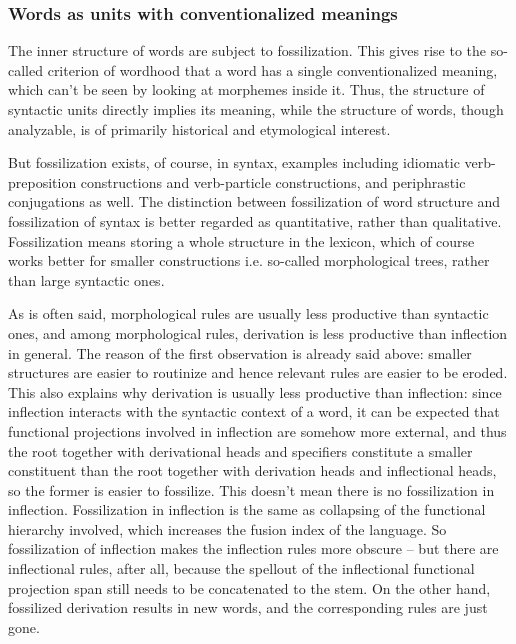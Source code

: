 \documentclass[UTF8, a4paper, oneside, scheme=plain]{ctexart}
\begin{document}
\subsubsection{Words as units with conventionalized meanings}\label{sec:word-meaning}

The inner structure of words are subject to fossilization.
This gives rise to the so-called criterion of wordhood 
that a word has a single conventionalized meaning,
which can't be seen by looking at morphemes inside it.
Thus, the structure of syntactic units directly implies its meaning,
while the structure of words,
though analyzable,
is of primarily historical and etymological interest.

But fossilization exists, of course, in syntax,
examples including idiomatic verb-preposition constructions 
and verb-particle constructions,
and periphrastic conjugations as well.
The distinction between fossilization of word structure and fossilization of syntax 
is better regarded as quantitative, rather than qualitative.
Fossilization means storing a whole structure in the lexicon,
which of course works better for smaller constructions i.e. so-called morphological trees,
rather than large syntactic ones.

As is often said, morphological rules are usually less productive than syntactic ones,
and among morphological rules,
derivation is less productive than inflection in general.
The reason of the first observation is already said above:
smaller structures are easier to routinize 
and hence relevant rules are easier to be eroded.
This also explains why derivation is usually less productive than inflection:
since inflection interacts with the syntactic context of a word,
it can be expected that functional projections involved in inflection 
are somehow more external,
and thus the root together with derivational heads and specifiers
constitute a smaller constituent than 
the root together with derivation heads and inflectional heads,
so the former is easier to fossilize.
This doesn't mean there is no fossilization in inflection.
Fossilization in inflection is the same as collapsing of the functional hierarchy involved,
which increases the fusion index of the language.
So fossilization of inflection makes the inflection rules more obscure 
-- but there are inflectional rules, after all,
because the spellout of the inflectional functional projection span 
still needs to be concatenated to the stem.
On the other hand, 
fossilized derivation results in new words,
and the corresponding rules are just gone.
\end{document}
